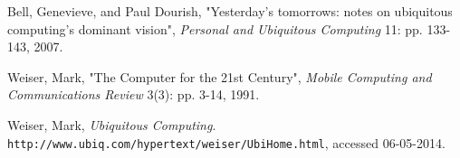 \begin{thebibliography}{9}

        Bell, Genevieve, and Paul Dourish,
        "Yesterday's tomorrows: notes on ubiquitous computing's dominant vision",
        \emph{Personal and Ubiquitous Computing} 11: pp. 133-143,
        2007.
        
        Weiser, Mark,
        "The Computer for the 21st Century",
        \emph{Mobile Computing and Communications Review} 3(3): pp. 3-14,
        1991.
        
        Weiser, Mark,
        \emph{Ubiquitous Computing}.
        \verb+http://www.ubiq.com/hypertext/weiser/UbiHome.html+, accessed 06-05-2014.
 
\end{thebibliography}